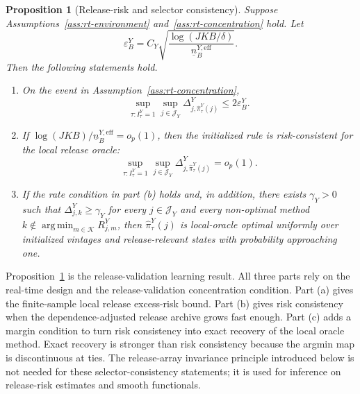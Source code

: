 \documentclass[a4paper, 12pt]{article}
\theoremstyle{plain}
\newtheorem{proposition}{Proposition}
\theoremstyle{remark}
\DeclareMathOperator*{\argmin}{arg\,min}
\newcommand{\Kcal}{\mathcal{K}}
\newcommand{\1}{\mathbf{1}}
\begin{document}
\begin{proposition}[Release-risk and selector consistency]
\label{prop:rt-selector-consistency}
Suppose Assumptions~\ref{ass:rt-environment} and~\ref{ass:rt-concentration} hold. Let
\begin{equation}
\label{eq:rt-epsilon}
    \varepsilon^Y_B
    =
    C_Y
    \sqrt{\frac{\log(JKB/\delta)}{\underline n^{Y,\mathrm{eff}}_B}} .
\end{equation}
Then the following statements hold.
\begin{enumerate}[label=(\alph*), leftmargin=*]
    \item On the event in Assumption~\ref{ass:rt-concentration},
    \begin{equation}
    \label{eq:rt-selector-excess}
        \sup_{\tau:I^Y_\tau=1}
        \sup_{j\in\mathcal J_Y}
        \Delta^Y_{j,\widehat\pi^Y_\tau(j)}
        \leq 2\varepsilon^Y_B .
    \end{equation}
    \item If \(\log(JKB)/\underline n^{Y,\mathrm{eff}}_B=o_p(1)\), then the initialized rule is risk-consistent for the local release oracle:
    \begin{equation}
    \label{eq:rt-risk-consistency}
        \sup_{\tau:I^Y_\tau=1}
        \sup_{j\in\mathcal J_Y}
        \Delta^Y_{j,\widehat\pi^Y_\tau(j)}=o_p(1).
    \end{equation}
    \item If the rate condition in part (b) holds and, in addition, there exists \(\gamma_Y>0\) such that \(\Delta^Y_{j,k}\geq\gamma_Y\) for every \(j\in\mathcal J_Y\) and every non-optimal method \(k\notin\argmin_{m\in\Kcal} R^Y_{j,m}\), then \(\widehat\pi^Y_\tau(j)\) is local-oracle optimal uniformly over initialized vintages and release-relevant states with probability approaching one.
\end{enumerate}
\end{proposition}

Proposition~\ref{prop:rt-selector-consistency} is the release-validation learning result. All three parts rely on the real-time design and the release-validation concentration condition. Part (a) gives the finite-sample local release excess-risk bound. Part (b) gives risk consistency when the dependence-adjusted release archive grows fast enough. Part (c) adds a margin condition to turn risk consistency into exact recovery of the local oracle method. Exact recovery is stronger than risk consistency because the argmin map is discontinuous at ties. The release-array invariance principle introduced below is not needed for these selector-consistency statements; it is used for inference on release-risk estimates and smooth functionals.
\end{document}
